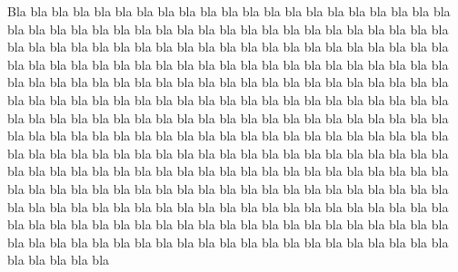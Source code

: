 \documentclass[english]{enstaPRE}
\begin{document}
Bla bla bla bla bla bla bla bla bla bla bla bla bla bla bla bla bla bla bla bla bla bla bla bla bla bla bla bla bla bla bla bla bla bla bla bla bla bla bla bla bla bla bla bla bla bla bla bla bla bla bla bla bla bla bla bla bla bla bla bla bla bla bla bla bla bla bla bla bla bla bla bla bla bla bla bla bla bla bla bla bla bla bla bla bla bla bla bla bla bla bla bla bla bla bla bla bla bla bla bla bla bla bla bla bla bla bla bla bla bla bla bla bla bla bla bla bla bla bla bla bla bla bla bla bla bla bla bla bla bla bla bla bla bla bla bla bla bla bla bla bla bla bla bla bla bla bla bla bla bla bla bla bla bla bla bla bla bla bla bla bla bla bla bla bla bla bla bla bla bla bla bla bla bla bla bla bla bla bla bla bla bla bla bla bla bla bla bla bla bla bla bla bla bla bla bla bla bla bla bla bla bla bla bla bla bla bla bla bla bla bla bla bla bla bla bla bla bla bla bla bla bla bla bla bla bla bla bla bla bla bla bla bla bla bla bla bla bla bla bla bla bla bla bla bla bla bla bla bla bla bla bla bla bla bla bla bla bla bla bla bla bla bla bla bla bla bla bla bla bla bla bla bla bla bla bla bla bla bla bla bla bla bla bla bla bla bla bla bla bla bla bla bla bla bla bla bla bla bla 
\end{document}
